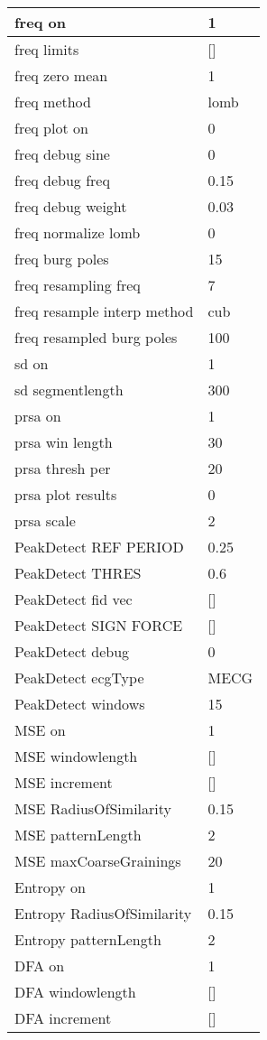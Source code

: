 \begin{tabular}{|l|l|}
freq on&1\\\hline
freq limits&[]\\\hline
freq zero mean&1\\\hline
freq method&lomb\\\hline
freq plot on&0\\\hline
freq debug sine&0\\\hline
freq debug freq&0.15\\\hline
freq debug weight&0.03\\\hline
freq normalize lomb&0\\\hline
freq burg poles&15\\\hline
freq resampling freq&7\\\hline
freq resample interp method&cub\\\hline
freq resampled burg poles&100\\\hline
sd on&1\\\hline
sd segmentlength&300\\\hline
prsa on&1\\\hline
prsa win length&30\\\hline
prsa thresh per&20\\\hline
prsa plot results&0\\\hline
prsa scale&2\\\hline
PeakDetect REF PERIOD&0.25\\\hline
PeakDetect THRES&0.6\\\hline
PeakDetect fid vec&[]\\\hline
PeakDetect SIGN FORCE&[]\\\hline
PeakDetect debug&0\\\hline
PeakDetect ecgType&MECG\\\hline
PeakDetect windows&15\\\hline
MSE on&1\\\hline
MSE windowlength&[]\\\hline
MSE increment&[]\\\hline
MSE RadiusOfSimilarity&0.15\\\hline
MSE patternLength&2\\\hline
MSE maxCoarseGrainings&20\\\hline
Entropy on&1\\\hline
Entropy RadiusOfSimilarity&0.15\\\hline
Entropy patternLength&2\\\hline
DFA on&1\\\hline
DFA windowlength&[]\\\hline
DFA increment&[]\\\hline

\end{tabular}
